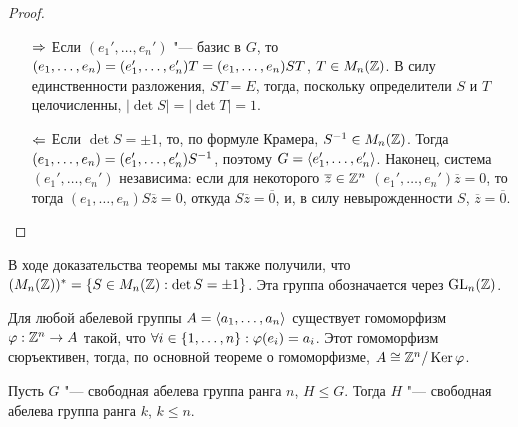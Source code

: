 \begin{proof}~
	\begin{itemize}
		\item[$\Rightarrow$] Если $(e_1', \dotsc, e_n')$ "--- базис в $G$, то  $(e_1, \dotsc, e_n) = (e_1', \dotsc, e_n')T \hm= (e_1, \dotsc, e_n)ST$, $T \hm\in M_n(\Z)$. В силу единственности разложения, $ST = E$, тогда, поскольку определители $S$ и $T$ целочисленны, $|\det{S}| = |\det{T}| = 1$.
		
		\item[$\Leftarrow$] Если $\det{S} = \pm1$, то, по формуле Крамера, $S^{-1} \in M_n(\mathbb{Z})$. Тогда $(e_1, \dotsc, e_n) \hm= (e_1', \dotsc, e_n')S^{-1}$, поэтому $G \hm= \gl e_1', \dotsc, e_n' \gr$. Наконец, система $(e_1', \dotsc, e_n')$ независима: если для некоторого $\overline{z} \in \mathbb{Z}^n$ $(e_1', \dotsc, e_n')\overline{z} = 0$, то тогда $(e_1, \dotsc, e_n)S\overline{z} = 0$, откуда $S\overline{z} = \overline{0}$, и, в силу невырожденности $S$, $\overline{z} = \overline{0}$.
	\end{itemize}
\end{proof}

\begin{note}
	В ходе доказательства теоремы мы также получили, что $(M_n(\Z))^* = \{S \hm\in M_n(\Z): \det{S} = \pm1\}$. Эта группа обозначается через $\operatorname{GL}_n(\mathbb{Z})$.
\end{note}

\begin{note}
	Для любой абелевой группы $A = \langle a_1, \dotsc, a_n \rangle$ существует гомоморфизм $\varphi: \mathbb{Z}^n \to A$ такой, что $\forall i \in \{1, \dotsc, n\}: \phi(e_i) \hm= a_i$. Этот гомоморфизм сюръективен, тогда, по основной теореме о гомоморфизме, $A \cong \mathbb{Z}^n / \operatorname{Ker}\varphi$.
\end{note}

\begin{theorem}
	Пусть $G$ "--- свободная абелева группа ранга $n$, $H \le G$. Тогда $H$ "--- свободная абелева группа ранга $k$, $k \le n$.
\end{theorem}

